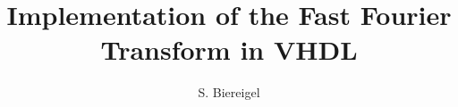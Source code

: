 \documentclass[a4paper]{scrreprt}
\begin{document}
\author{S. Biereigel}
\title{Implementation of the Fast Fourier Transform in VHDL}



\tableofcontents
\pagebreak





\listoftables
\listoffigures
\end{document}

